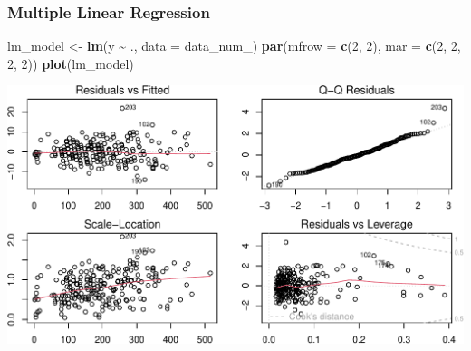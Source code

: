 \documentclass[
]{article}
\newenvironment{Shaded}{\begin{snugshade}}{\end{snugshade}}
\newcommand{\AttributeTok}[1]{\textcolor[rgb]{0.13,0.29,0.53}{#1}}
\newcommand{\DecValTok}[1]{\textcolor[rgb]{0.00,0.00,0.81}{#1}}
\newcommand{\FunctionTok}[1]{\textcolor[rgb]{0.13,0.29,0.53}{\textbf{#1}}}
\newcommand{\NormalTok}[1]{#1}
\newcommand{\OtherTok}[1]{\textcolor[rgb]{0.56,0.35,0.01}{#1}}
\newcommand{\SpecialCharTok}[1]{\textcolor[rgb]{0.81,0.36,0.00}{\textbf{#1}}}
\newcommand{\StringTok}[1]{\textcolor[rgb]{0.31,0.60,0.02}{#1}}
\begin{document}
\subsubsection{Multiple Linear
Regression}\label{multiple-linear-regression}

\begin{Shaded}
\begin{Highlighting}[]
\NormalTok{lm\_model }\OtherTok{\textless{}{-}} \FunctionTok{lm}\NormalTok{(y }\SpecialCharTok{\textasciitilde{}}\NormalTok{ ., }\AttributeTok{data =}\NormalTok{ data\_num\_)}
\FunctionTok{par}\NormalTok{(}\AttributeTok{mfrow =} \FunctionTok{c}\NormalTok{(}\DecValTok{2}\NormalTok{, }\DecValTok{2}\NormalTok{), }\AttributeTok{mar =} \FunctionTok{c}\NormalTok{(}\DecValTok{2}\NormalTok{, }\DecValTok{2}\NormalTok{, }\DecValTok{2}\NormalTok{, }\DecValTok{2}\NormalTok{))}
\FunctionTok{plot}\NormalTok{(lm\_model)}
\end{Highlighting}
\end{Shaded}

\begin{center}\includegraphics{Statistical_Learning_Final_Report_files/figure-latex/linear_regression-1} \end{center}

\begin{Shaded}
\end{Shaded}
\end{document}
